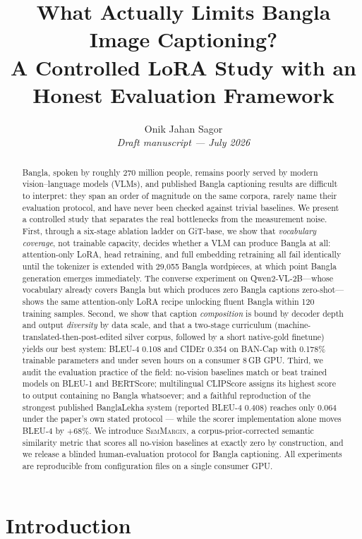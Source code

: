 \documentclass[11pt]{article}
\title{What Actually Limits Bangla Image Captioning?\\
\large A Controlled LoRA Study with an Honest Evaluation Framework}
\author{Onik Jahan Sagor\\
\small \textit{Draft manuscript --- July 2026}}
\date{}
\newcommand{\semmargin}{\textsc{SemMargin}}
\begin{document}
\maketitle

\begin{abstract}
Bangla, spoken by roughly 270 million people, remains poorly served by
modern vision--language models (VLMs), and published Bangla captioning
results are difficult to interpret: they span an order of magnitude on
the same corpora, rarely name their evaluation protocol, and have never
been checked against trivial baselines. We present a controlled study
that separates the real bottlenecks from the measurement noise. First,
through a six-stage ablation ladder on GiT-base, we show that
\emph{vocabulary coverage}, not trainable capacity, decides whether a
VLM can produce Bangla at all: attention-only LoRA, head retraining,
and full embedding retraining all fail identically until the tokenizer
is extended with 29{,}055 Bangla wordpieces, at which point Bangla
generation emerges immediately. The converse experiment on
Qwen2-VL-2B---whose vocabulary already covers Bangla but which produces
zero Bangla captions zero-shot---shows the same attention-only LoRA
recipe unlocking fluent Bangla within 120 training samples. Second, we
show that caption \emph{composition} is bound by decoder depth and
output \emph{diversity} by data scale, and that a two-stage curriculum
(machine-translated-then-post-edited silver corpus, followed by a short
native-gold finetune) yields our best system: BLEU-4 0.108 and CIDEr
0.354 on BAN-Cap with 0.178\% trainable parameters and under seven
hours on a consumer 8\,GB GPU. Third, we audit the evaluation practice
of the field: no-vision baselines match or beat trained models on
BLEU-1 and BERTScore; multilingual CLIPScore assigns its highest score
to output containing no Bangla whatsoever; and a faithful
reproduction of the strongest published BanglaLekha system (reported
BLEU-4 0.408) reaches only 0.064 under the paper's own stated protocol
--- while the scorer implementation alone moves BLEU-4 by $+68\%$. We
introduce \semmargin{}, a corpus-prior-corrected semantic similarity
metric that scores all no-vision baselines at exactly zero by
construction, and we release a blinded human-evaluation protocol for
Bangla captioning. All experiments are reproducible from configuration
files on a single consumer GPU.
\end{abstract}

\section{Introduction}
\end{document}
